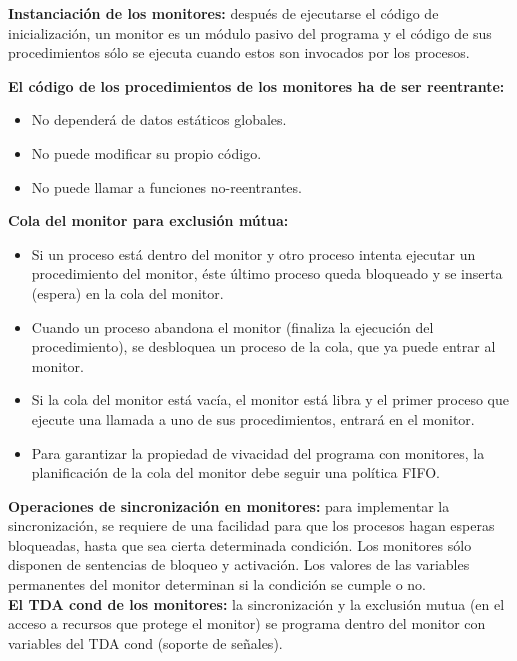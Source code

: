 \documentclass[a4paper,11pt]{article}
\begin{document}
\textbf{Instanciación de los monitores:} después de ejecutarse el código de inicialización, un monitor es un módulo pasivo del programa y el código de sus procedimientos sólo se ejecuta cuando estos son invocados por los procesos.

\textbf{El código de los procedimientos de los monitores ha de ser reentrante:}
\begin{itemize}
\item No dependerá de datos estáticos globales.
\item No puede modificar su propio código.
\item No puede llamar a funciones no-reentrantes.
\end{itemize}

\textbf{Cola del monitor para exclusión mútua:}
\begin{itemize}
\item Si un proceso está dentro del monitor y otro proceso intenta ejecutar un procedimiento del monitor, éste último proceso queda bloqueado y se inserta (espera) en la cola del monitor.

\item Cuando un proceso abandona el monitor (finaliza la ejecución del procedimiento), se desbloquea un proceso de la cola, que ya puede entrar al monitor.

\item Si la cola del monitor está vacía, el monitor está libra y el primer proceso que ejecute una llamada a uno de sus procedimientos, entrará en el monitor.

\item Para garantizar la propiedad de vivacidad del programa con monitores, la planificación de la cola del monitor debe seguir una política FIFO. 
\end{itemize}

\textbf{Operaciones de sincronización en monitores:} para implementar la sincronización, se requiere de una facilidad para que los procesos hagan esperas bloqueadas, hasta que sea cierta determinada condición. Los monitores sólo disponen de sentencias de bloqueo y activación. Los valores de las variables permanentes del monitor determinan si la condición se cumple o no. \\

\textbf{El TDA cond de los monitores:} la sincronización y la exclusión mutua (en el acceso a recursos que protege el monitor) se programa dentro del monitor con variables del TDA cond (soporte de señales). \\
\end{document}
